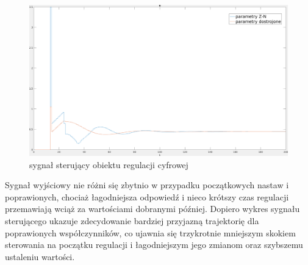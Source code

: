\documentclass[fleqn]{article}
\begin{document}
\begin{figure}[H]
	\includegraphics[width=\textwidth]{scripts/dyskretster.png}
	\caption{sygnał sterujący obiektu regulacji cyfrowej}
\end{figure}

Sygnał wyjściowy nie różni się zbytnio w przypadku początkowych nastaw i poprawionych, chociaż łagodniejsza odpowiedź i nieco krótszy czas regulacji przemawiają wciąż za wartościami dobranymi później. Dopiero wykres sygnału sterującego ukazuje zdecydowanie bardziej przyjazną trajektorię dla poprawionych współczynników, co ujawnia się trzykrotnie mniejszym skokiem sterowania na początku regulacji i łagodniejszym jego zmianom oraz szybszemu ustaleniu wartości.
\end{document}
